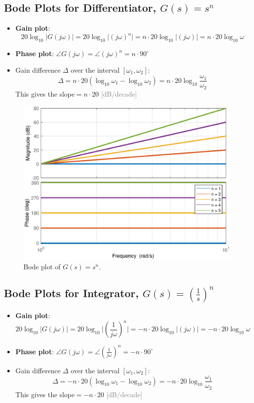 \subsection{Bode Plots for Differentiator, $G(s) = s^{n}$}
\begin{itemize}
    \item \textbf{Gain plot}: 
    \[
        20\log_{10}\lvert G(j\omega) \rvert  = 20\log_{10}\lvert (j\omega)^{n} \rvert = n\cdot 20\log_{10}\lvert (j\omega) \rvert=\boxed{n\cdot20\log_{10}\omega}
    \]
    
    \item \textbf{Phase plot}: $\angle G(j\omega) = \angle (j\omega)^{n} = \boxed{n\cdot 90^{\circ}}$
    
    \item Gain difference $\Delta$ over the interval $[\omega_{1}, \omega_{2}] $: 
    \[
        \Delta = n\cdot20(\log_{10}\omega_{1}-\log_{10}\omega_{2})=\boxed{n\cdot20 \log_{10}\frac{\omega_{1}}{\omega_{2}}}
    \]
    This gives the slope$=n\cdot 20$ \textcolor{gray}{[dB/decade]}
\end{itemize}

\begin{figure}[H] 
    \centering 
    \includegraphics[width=.7\textwidth]{images/bode6.eps}
    \caption{Bode plot of $G(s) = s^{n}$.}
\end{figure}

\subsection{Bode Plots for Integrator, $G(s) = (\frac{1}{s})^{n}$}
\begin{itemize}
    \item \textbf{Gain plot}:
    \[
        20\log_{10}\lvert G(j\omega) \rvert
        = 20 \log_{10} \lvert (\frac{1}{j\omega})^{n} \rvert 
        = -n \cdot 20 \log_{10} \lvert (j\omega) \rvert
        = \boxed{-n\cdot20\log_{10}\omega}
    \]
    
    \item \textbf{Phase plot}: $\angle G(j\omega) = \angle (\frac{1}{j\omega})^{n} = \boxed{-n\cdot 90^{\circ}}$
    
    \item Gain difference $\Delta$ over the interval $[\omega_{1}, \omega_{2}] $: 
    \[ 
        \Delta = -n\cdot20(\log_{10}\omega_{1}-\log_{10}\omega_{2})=\boxed{-n\cdot20 \log_{10}\frac{\omega_{1}}{\omega_{2}}}
    \]
    This gives the slope$=-n\cdot 20$ \textcolor{gray}{[dB/decade]}
\end{itemize}

